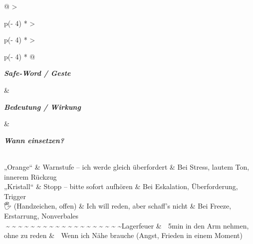\begin{longtable}[]{@{}
  >{\raggedright\arraybackslash}p{(\columnwidth - 4\tabcolsep) * }
  >{\raggedright\arraybackslash}p{(\columnwidth - 4\tabcolsep) * }
  >{\raggedright\arraybackslash}p{(\columnwidth - 4\tabcolsep) * }@{}}
\toprule\noalign{}
\begin{minipage}[b]{\linewidth}\raggedright
\emph{\textbf{Safe-Word / Geste}}
\end{minipage} \& \begin{minipage}[b]{\linewidth}\raggedright
\emph{\textbf{Bedeutung / Wirkung}}
\end{minipage} \& \begin{minipage}[b]{\linewidth}\raggedright
\emph{\textbf{Wann einsetzen?}}
\end{minipage} \\
\midrule\noalign{}
\endhead
\bottomrule\noalign{}
\endlastfoot
„Orange`` \& Warnstufe -- ich werde gleich überfordert \& Bei Stress, lautem Ton, innerem Rückzug \\
„Kristall`` \& Stopp -- bitte sofort aufhören \& Bei Eskalation, Überforderung, Trigger \\
🖐️ (Handzeichen, offen) \& Ich will reden, aber schaff's nicht \& Bei Freeze, Erstarrung, Nonverbales \\
📝\textasciitilde{} \textasciitilde{} \textasciitilde{} \textasciitilde{} \textasciitilde{} \textasciitilde{} \textasciitilde{} \textasciitilde{} \textasciitilde{} \textasciitilde{} \textasciitilde{} \textasciitilde{} \textasciitilde{} \textasciitilde{} \textasciitilde{} \textasciitilde{} \textasciitilde{} \textasciitilde{} \textasciitilde{}Lagerfeuer \& 📝 5min in den Arm nehmen, ohne zu reden \& 📝 Wenn ich Nähe brauche (Angst, Frieden in einem Moment) \\

\end{longtable}

